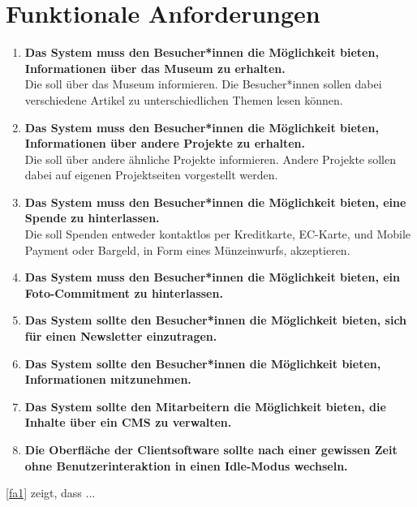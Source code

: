 \section{Funktionale Anforderungen}
\label{funktionale}

\begin{enumerate}[label=\textbf{FA\arabic*}]
	\item\label{fa1} \textbf{Das System muss den Besucher*innen die Möglichkeit bieten, Informationen über das Museum zu erhalten.}\\
  Die \shst{} soll über das Museum informieren. Die Besucher*innen sollen dabei verschiedene Artikel zu unterschiedlichen Themen lesen können. 
	\item\label{fa2} \textbf{Das System muss den Besucher*innen die Möglichkeit bieten, Informationen über andere Projekte zu erhalten.}\\
  Die \shst{} soll über andere ähnliche Projekte informieren. Andere Projekte sollen dabei auf eigenen Projektseiten vorgestellt werden.
  \item\label{fa3} \textbf{Das System muss den Besucher*innen die Möglichkeit bieten, eine Spende zu hinterlassen.}\\
  Die \shst{} soll Spenden entweder kontaktlos per Kreditkarte, EC-Karte, und Mobile Payment oder Bargeld, in Form eines Münzeinwurfs, akzeptieren.
  \item\label{fa4} \textbf{Das System muss den Besucher*innen die Möglichkeit bieten, ein Foto-Commitment zu hinterlassen.}\\
  \item\label{fa5} \textbf{Das System sollte den Besucher*innen die Möglichkeit bieten, sich für einen Newsletter einzutragen.}\\ %
  \item\label{fa6} \textbf{Das System sollte den Besucher*innen die Möglichkeit bieten, Informationen mitzunehmen.}\\
  \item\label{fa7} \textbf{Das System sollte den Mitarbeitern die Möglichkeit bieten, die Inhalte über ein CMS zu verwalten.}\\
  \item\label{fa8} \textbf{Die Oberfläche der Clientsoftware sollte nach einer gewissen Zeit ohne Benutzerinteraktion in einen Idle-Modus wechseln.}\\
\end{enumerate}


\ref{fa1} zeigt, dass ...
